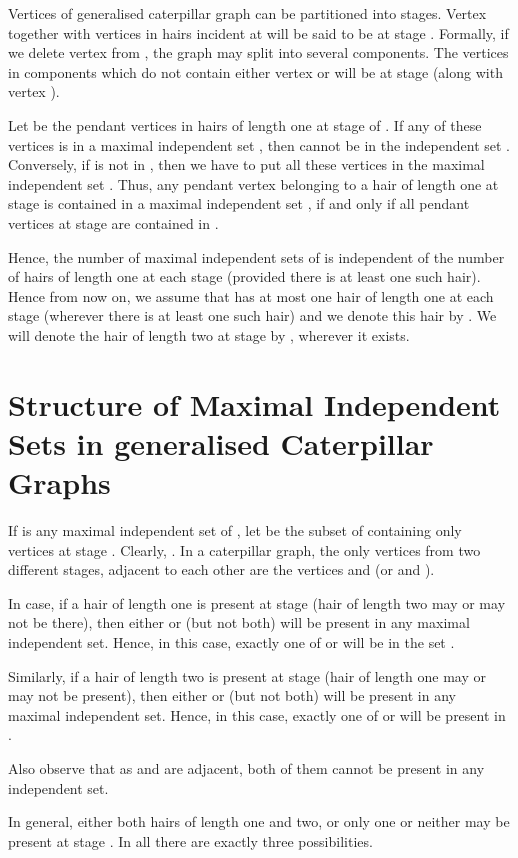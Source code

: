 \documentclass[10pt]{article}
\begin{document}
Vertices of generalised caterpillar graph can be partitioned into stages.
Vertex  together with vertices in hairs incident at  will be
said to be at stage . Formally, if we delete vertex  from
, the graph may split into several components. The vertices
in components which do not contain either vertex  or 
will be at stage  (along with vertex ). 

Let  be the pendant vertices in hairs of length
one at stage  of . If any of these vertices is in a
maximal independent set , then  cannot be in the independent set
. Conversely, if  is not in , then we have to put all these
vertices in the maximal independent set . Thus, any pendant vertex
belonging to a hair of length one at stage  is contained in a maximal
independent set , if and only if all pendant vertices at stage  are
contained in .

Hence, the number of maximal independent sets of  is
independent of the number of hairs of length one at each stage (provided
there is at least one such hair).  Hence from now on, we assume that
 has at most one hair of length one at each stage 
(wherever there is at least one such hair) and we denote this hair by
.  We will denote the hair of length two at stage  by
, wherever it exists.


\section{Structure of Maximal Independent Sets in generalised Caterpillar
Graphs}

If  is any maximal independent set of , let  be the
subset of  containing only vertices at stage . Clearly, .  In a caterpillar graph, the only vertices from two
different stages, adjacent to each other are the vertices  and
 (or  and ).

In case, if a hair of length one is present at stage  (hair of length
two may or may not be there), then either  or  (but not both)
will be present in any maximal independent set. Hence, in this case,
exactly one of  or  will be in the set .

Similarly, if a hair of length two is present at stage  (hair of
length one may or may not be present), then either  or  (but
not both) will be present in any maximal independent set. Hence, in this
case, exactly one of  or  will be present in .

Also observe that as  and  are adjacent, both of them cannot be
present in any independent set.

In general, either both hairs of length one and two, or only one or
neither may be present at stage . In all there are exactly three
possibilities. \\ 
\end{document}
